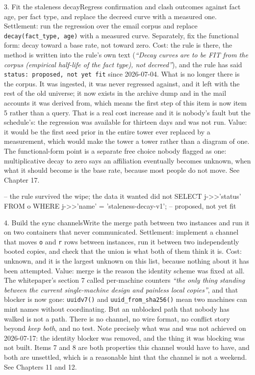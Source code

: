\begin{Open}{3. Fit the staleness decay}{Regress confirmation and clash outcomes against fact age, per fact type, and replace the decreed curve with a measured one.}
Settlement: run the regression over the email corpus and replace \texttt{decay(fact\_type, age)} with a measured curve. Separately, fix the functional form: decay toward a base rate, not toward zero. Cost: the rule is there, the method is written into the rule's own text (\textit{``Decay curves are to be FIT from the corpus (empirical half-life of the fact type), not decreed''}), and the rule has said \texttt{status: proposed, not yet fit} since 2026-07-04. What is no longer there is the corpus. It was ingested, it was never regressed against, and it left with the rest of the old universe; it now exists in the archive dump and in the mail accounts it was derived from, which means the first step of this item is now item 5 rather than a query. That is a real cost increase and it is nobody's fault but the schedule's: the regression was available for thirteen days and was not run. Value: it would be the first seed prior in the entire tower ever replaced by a measurement, which would make the tower a tower rather than a diagram of one. The functional-form point is a separate free choice nobody flagged as one: multiplicative decay to zero says an affiliation eventually becomes unknown, when what it should become is the base rate, because most people do not move. See Chapter 17.
\begin{Check}
-- the rule survived the wipe; the data it wanted did not
SELECT j->>'status' FROM o WHERE j->>'name' = 'staleness-decay-v1';
  -- proposed, not yet fit
\end{Check}
\end{Open}

\begin{Open}{4. Build the sync channels}{Write the merge path between two instances and run it on two containers that never communicated.}
Settlement: implement a channel that moves \texttt{o} and \texttt{r} rows between instances, run it between two independently booted copies, and check that the union is what both of them think it is. Cost: unknown, and it is the largest unknown on this list, because nothing about it has been attempted. Value: merge is the reason the identity scheme was fixed at all. The whitepaper's section 7 called per-machine counters \textit{``the only thing standing between the current single-machine design and painless local copies''}, and that blocker is now gone: \texttt{uuidv7()} and \texttt{uuid\_from\_sha256()} mean two machines can mint names without coordinating. But an unblocked path that nobody has walked is not a path. There is no channel, no wire format, no conflict story beyond \textit{keep both}, and no test. Note precisely what was and was not achieved on 2026-07-17: the identity blocker was removed, and the thing it was blocking was not built. Items 7 and 8 are both properties this channel would have to have, and both are unsettled, which is a reasonable hint that the channel is not a weekend. See Chapters 11 and 12.
\end{Open}

